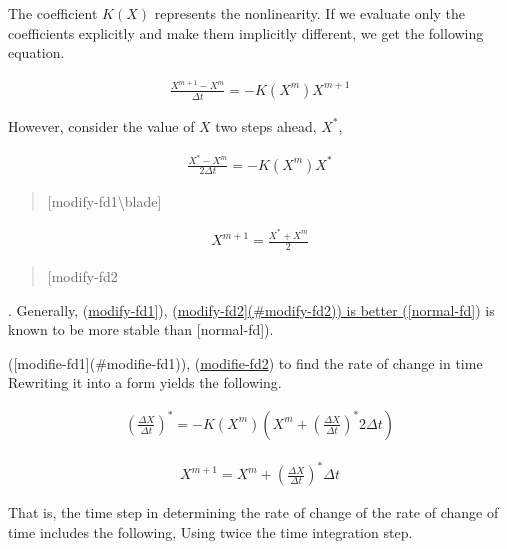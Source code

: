 The coefficient \(K(X)\) represents the nonlinearity. If we evaluate
only the coefficients explicitly and make them implicitly different, we
get the following equation.

\begin{eqnarray}
  \frac{X^{m+1} - X^m}{\Delta t} = - K( X^m ) X^{m+1}
\end{eqnarray}

\begin{quote}
\protect\hypertarget{normal-fd}{}{\centric[normal-fd]}
\end{quote}

However, consider the value of \(X\) two steps ahead, \(X^{\ast}\),

\begin{eqnarray}
  \frac{X^{\ast} - X^m}{2\Delta t} = - K ( X^m ) X^{\ast}
\end{eqnarray}

\begin{quote}
\protect\hypertarget{modify-fd1}{}{{[}modify-fd1\textbackslash blade{]}}
\end{quote}

\begin{eqnarray}
  X^{m+1} = \frac{X^{\ast} + X^m}2
\end{eqnarray}

\begin{quote}
\protect\hypertarget{modify-fd2}{}{{[}modify-fd2\Backlash{]}}
\end{quote}

. Generally, (\protect\hyperlink{modify-fd1}{modify-fd1{]}}),
(\protect\hyperlink{normal-fd}{modify-fd2{]}(\#modify-fd2)) is better
({[}normal-fd{]}}) is known to be more stable than {[}normal-fd{]}).

({[}modifie-fd1{]}(\#modifie-fd1)),
(\protect\hyperlink{modifie-fd2}{modifie-fd2\lenses}) to find the rate
of change in time Rewriting it into a form yields the following.

\begin{eqnarray}
  \left(\frac{\Delta X}{\Delta t}\right)^{\ast} = 
     - K( X^m ) \left( X^m + 
        \left(\frac{\Delta X}{\Delta t}\right)^{\ast} 
        2 \Delta t \right)
\end{eqnarray}

\begin{eqnarray}
  X^{m+1} = X^m + \left(\frac{\Delta X}{\Delta t}\right)^{\ast} \Delta t
\end{eqnarray}

That is, the time step in determining the rate of change of the rate of
change of time includes the following, Using twice the time integration
step.
